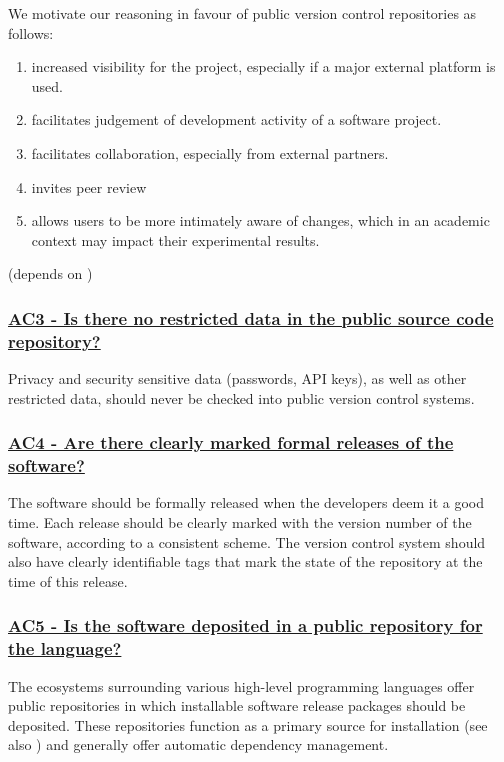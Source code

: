 \documentclass[a4paper,11pt]{article}
\newcommand{\criterion}[2]{\subsubsection*{\underline{#1 - #2}}\label{id:#1}}
\newcommand\CheckTable{%
  \begin{tabular}{ccccc}
    No & Minimal & Adequate & Good & Perfect \\
    0 & 1 & 2 & 3 & 4 \\
    \hline
    $\square$ & $\square$ & $\square$ & $\square$ & $\square$ \\
  \end{tabular}%
}
\newcommand{\refcrit}[1]{%
 \framebox[1.1\width]{\hyperref[id:#1]{#1}}
}
\begin{document}
We motivate our reasoning in favour of public version control repositories as follows:

\begin{enumerate}
    \item increased visibility for the project, especially if a major external platform is used.
    \item facilitates judgement of development activity of a software project.
    \item facilitates collaboration, especially from external partners.
    \item invites peer review
    \item allows users to be more intimately aware of changes, which in an
        academic context may impact their experimental results.
\end{enumerate}

(depends on \refcrit{AC1})


\newcommand{\acThreeID}{AC3}
\newcommand{\acThreeText}{Is there no restricted data in the public source code repository?}
\criterion{\acThreeID}{\acThreeText}

Privacy and security sensitive data (passwords, API keys), as well as other
restricted data, should never be checked into public version control systems.


\newcommand{\acFourID}{AC4}
\newcommand{\acFourText}{Are there clearly marked formal releases of the software?}
\criterion{\acFourID}{\acFourText}

The software should be formally released when the developers deem it a good
time. Each release should be clearly marked with the version number of the
software, according to a consistent scheme. The version control system should
also have clearly identifiable tags that mark the state of the repository at
the time of this release.


\newcommand{\acFiveID}{AC5}
\newcommand{\acFiveText}{Is the software deposited in a public repository for the language?}
\criterion{\acFiveID}{\acFiveText}

The ecosystems surrounding various high-level programming languages offer
public repositories in which installable software release packages should be
deposited. These repositories function as a primary source for installation (see also
\refcrit{IS3}) and generally offer automatic dependency management.
\end{document}
